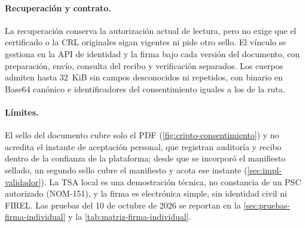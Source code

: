 \paragraph{Recuperación y contrato.} La recuperación conserva la autorización
actual de lectura, pero no exige que el certificado o la CRL originales sigan
vigentes ni pide otro sello. El vínculo se gestiona
en la API de identidad y la firma bajo cada versión del documento,
con preparación, envío, consulta del recibo y verificación separados. Los
cuerpos admiten hasta 32~KiB sin campos desconocidos ni repetidos, con binario
en Base64 canónico e identificadores del consentimiento iguales a los de la
ruta.

\paragraph{Límites.} El sello del documento cubre solo el PDF (\cref{fig:cripto-consentimiento})
y no acredita el instante de aceptación personal, que registran auditoría y
recibo dentro de la confianza de la plataforma; desde que se incorporó el
manifiesto sellado, un segundo sello cubre el manifiesto y acota ese instante
(\cref{sec:impl-validador}). La TSA local es una
demostración técnica, no constancia de un PSC autorizado (NOM-151), y la firma
es electrónica simple, sin identidad civil ni FIREL. Las pruebas del 10 de
octubre de 2026 se reportan en la \cref{sec:pruebas-firma-individual} y la
\cref{tab:matriz-firma-individual}.

